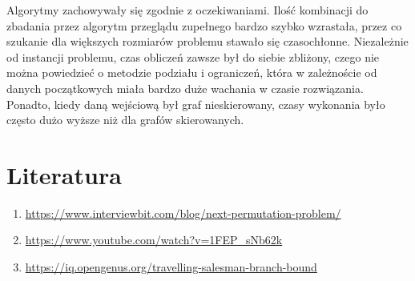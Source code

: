 \documentclass{article}
\begin{document}
Algorytmy zachowywały się zgodnie z oczekiwaniami. Ilość kombinacji do zbadania przez algorytm przeglądu zupełnego bardzo szybko wzrastała, przez co szukanie dla większych rozmiarów problemu stawało się czasochłonne. Niezależnie od instancji problemu, czas obliczeń zawsze był do siebie zbliżony, czego nie można powiedzieć o metodzie podziału i ograniczeń, która w zależnoście od danych początkowych miała bardzo duże wachania w czasie rozwiązania. Ponadto, kiedy daną wejściową był graf nieskierowany, czasy wykonania było często dużo wyższe niż dla grafów skierowanych.


\section{Literatura}

\begin{enumerate}
    \item \url{https://www.interviewbit.com/blog/next-permutation-problem/}
    \item \url{https://www.youtube.com/watch?v=1FEP_sNb62k}
        \item \url{https://iq.opengenus.org/travelling-salesman-branch-bound}
\end{enumerate}
\end{document}
